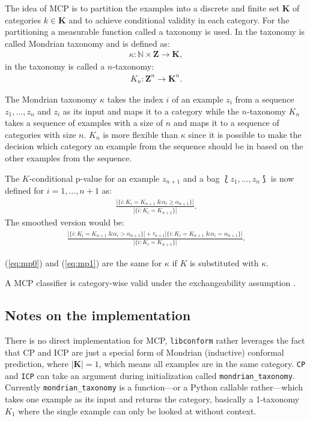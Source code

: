 \documentclass[twoside,11pt]{article}
\def\libconform{\texttt{libconform}}
\begin{document}
The idea of MCP is to partition the examples into a
discrete and finite set $\textbf{K}$ of categories
$k \in \textbf{K}$ and to achieve conditional validity in
each category.
For the partitioning a measurable function called a
taxonomy is used.
In \citet[Chapter 4.5]{alrw} the taxonomy is called
Mondrian taxonomy and is defined as:
\begin{align*}
  \kappa: \mathbb{N} \times \textbf{Z} \rightarrow
  \textbf{K},
\end{align*}
in \citet[Chapter 2]{cprml} the taxonomy is called a
$n$-taxonomy:
\begin{align*}
  K_n: \textbf{Z}^n \rightarrow \textbf{K}^n.
\end{align*}

The Mondrian taxonomy $\kappa$ takes the index $i$ of an
example $z_i$ from a sequence $z_1,\dots,z_n$ and $z_i$ as
its input and maps it to a category while the $n$-taxonomy
$K_n$ takes a sequence of examples with a size of $n$ and
maps it to a sequence of categories with size $n$.
$K_n$ is more flexible than $\kappa$ since it is possible
to make the decision which category an example from the
sequence should be in based on the other examples from the
sequence.

The $K$-conditional p-value for an example $z_{n+1}$ and
a bag $\Lbag z_1,\dots,z_n \Rbag$ is now defined for
$i=1,\dots,n+1$ as:
\begin{align}
  \label{eq:mp0}
  \frac{|\{i:K_i = K_{n+1} \text{ \& } \alpha_i
        \geq \alpha_{n+1}\}|}
  {|\{i: K_i = K_{n+1}\}|}.
\end{align}
The smoothed version would be:
\begin{align}
  \label{eq:mp1}
  \frac{|\{i:K_i = K_{n+1} \text{ \& } \alpha_i >
        \alpha_{n+1}\}| + \tau_{n+1}
        |\{i:K_i = K_{n+1} \text{ \& } \alpha_i =
        \alpha_{n+1}\}|}
  {|\{i: K_i = K_{n+1}\}|}.
\end{align}

(\ref{eq:mp0}) and (\ref{eq:mp1}) are the same for $\kappa$
if $K$ is substituted with $\kappa$.

A MCP classifier is category-wise valid under the
exchangeability assumption \citep[see][]{alrw, cprml}.

\subsection*{Notes on the implementation}

There is no direct implementation for MCP, \libconform{}
rather leverages the fact that CP and ICP are just a
special form of Mondrian (inductive) conformal prediction,
where $|\textbf{K}| = 1$, which means all examples are in
the same category.
\texttt{CP} and \texttt{ICP} can take an argument during
initialization called \texttt{mondrian\_taxonomy}.
Currently \texttt{mondrian\_taxonomy} is a function---or
a Python callable rather---which takes one example as its
input and returns the category, basically a 1-taxonomy
$K_1$ where the single example can only be looked at
without context.
\end{document}

